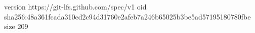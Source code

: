 version https://git-lfs.github.com/spec/v1
oid sha256:48a361fcada310cd2c94d31760e2afeb7a246b65025b3be5ad57195180780fbe
size 209
